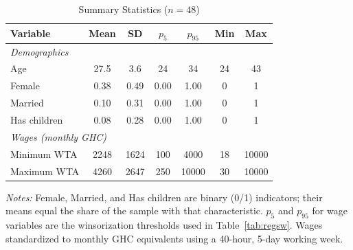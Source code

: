 \begin{table}[h!]
\centering
\begin{threeparttable}
\caption{Summary Statistics ($n = 48$)}
\label{tab:sumstats}
\begin{tabular}{lcccccc}
\toprule
\textbf{Variable} & \textbf{Mean} & \textbf{SD} & $p_{5}$ & $p_{95}$ & \textbf{Min} & \textbf{Max} \\
\midrule
\multicolumn{7}{l}{\textit{Demographics}} \\[2pt]
Age &  27.5 &   3.6 &    24 &    34 &    24 &    43 \\
Female &  0.38 &  0.49 &  0.00 &  1.00 &     0 &     1 \\
Married &  0.10 &  0.31 &  0.00 &  1.00 &     0 &     1 \\
Has children &  0.08 &  0.28 &  0.00 &  1.00 &     0 &     1 \\[4pt]
\multicolumn{7}{l}{\textit{Wages (monthly GHC)}} \\[2pt]
Minimum WTA &   2248 &   1624 &    100 &   4000 &     18 &  10000 \\
Maximum WTA &   4260 &   2647 &    250 &  10000 &     30 &  10000 \\
\bottomrule
\end{tabular}
\begin{tablenotes}[flushleft]
\scriptsize
\item \textit{Notes:} Female, Married, and Has children are binary (0/1) indicators; their means equal the share of the sample with that characteristic. $p_5$ and $p_{95}$ for wage variables are the winsorization thresholds used in Table~\ref{tab:regsw}. Wages standardized to monthly GHC equivalents using a 40-hour, 5-day working week.
\end{tablenotes}
\end{threeparttable}
\end{table}
